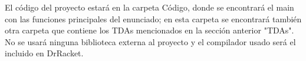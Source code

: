 El código del proyecto estará en la carpeta Código, donde se encontrará el main con las funciones principales del enunciado; en esta carpeta se encontrará
también otra carpeta que contiene los TDAs mencionados en la sección anterior "TDAs". No se usará ninguna biblioteca externa al proyecto y el compilador usado
será el incluido en DrRacket.